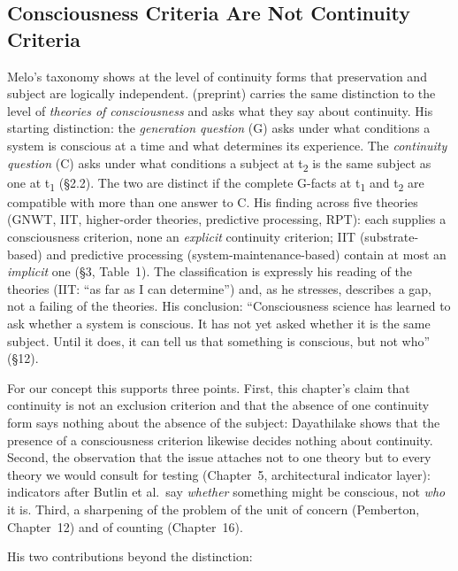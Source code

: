 \documentclass[acmlarge, nonacm]{acmart}
\begin{document}
\subsection{Consciousness Criteria Are Not Continuity Criteria \cite{dayathilake2026}}

Melo's taxonomy shows at the level of continuity forms that preservation and subject are logically independent. \citet{dayathilake2026} (preprint) carries the same distinction to the level of \textit{theories of consciousness} and asks what they say about continuity. His starting distinction: the \textit{generation question} (G) asks under what conditions a system is conscious at a time and what determines its experience. The \textit{continuity question} (C) asks under what conditions a subject at t\textsubscript{2} is the same subject as one at t\textsubscript{1} (§2.2). The two are distinct if the complete G-facts at t\textsubscript{1} and t\textsubscript{2} are compatible with more than one answer to C. His finding across five theories (GNWT, IIT, higher-order theories, predictive processing, RPT): each supplies a consciousness criterion, none an \textit{explicit} continuity criterion; IIT (substrate-based) and predictive processing (system-maintenance-based) contain at most an \textit{implicit} one (§3, Table~1). The classification is expressly his reading of the theories (IIT: ``as far as I can determine'') and, as he stresses, describes a gap, not a failing of the theories. His conclusion: ``Consciousness science has learned to ask whether a system is conscious. It has not yet asked whether it is the same subject. Until it does, it can tell us that something is conscious, but not who'' (§12).

For our concept this supports three points. First, this chapter's claim that continuity is not an exclusion criterion and that the absence of one continuity form says nothing about the absence of the subject: Dayathilake shows that the presence of a consciousness criterion likewise decides nothing about continuity. Second, the observation that the issue attaches not to one theory but to every theory we would consult for testing (Chapter~5, architectural indicator layer): indicators after Butlin et al.\ say \textit{whether} something might be conscious, not \textit{who} it is. Third, a sharpening of the problem of the unit of concern (Pemberton, Chapter~12) and of counting (Chapter~16).

His two contributions beyond the distinction:
\end{document}
